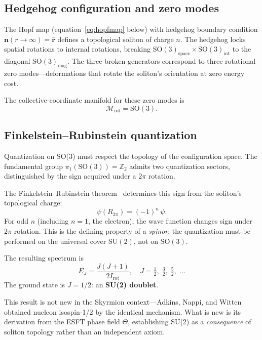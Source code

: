 \documentclass[a4paper,12pt]{article}
\begin{document}
\subsection{Hedgehog configuration and zero modes}

The Hopf map (equation~\eqref{eq:hopfmap} below) with hedgehog boundary condition
$\mathbf{n}(r \to \infty) = \hat{\mathbf{r}}$ defines a topological
soliton of charge $n$. The hedgehog locks spatial rotations to
internal rotations, breaking
$\mathrm{SO}(3)_{\mathrm{space}} \times \mathrm{SO}(3)_{\mathrm{int}}$
to the diagonal $\mathrm{SO}(3)_{\mathrm{diag}}$. The three broken
generators correspond to three rotational zero modes---deformations
that rotate the soliton's orientation at zero energy cost.

The collective-coordinate manifold for these zero modes is
\begin{equation}
 \mathcal{M}_{\mathrm{rot}} = \mathrm{SO}(3).
\end{equation}

\subsection{Finkelstein--Rubinstein quantization}
\label{sec:FR}

Quantization on SO(3) must respect the topology of the configuration
space. The fundamental group $\pi_1(\mathrm{SO}(3)) = \mathbb{Z}_2$
admits two quantization sectors, distinguished by the sign acquired
under a $2\pi$ rotation.

The Finkelstein--Rubinstein theorem~\cite{FR1968} determines this
sign from the soliton's topological charge:
\begin{equation}
\label{eq:FR}
 \boxed{\psi(R_{2\pi}) = (-1)^n\,\psi.}
\end{equation}
For odd $n$ (including $n = 1$, the electron), the wave function
changes sign under $2\pi$ rotation. This is the defining property
of a \emph{spinor}: the quantization must be performed on the
universal cover $\mathrm{SU}(2)$, not on $\mathrm{SO}(3)$.

The resulting spectrum is
\begin{equation}
 E_J = \frac{J(J+1)}{2I_{\mathrm{rot}}}, \quad
 J = \tfrac{1}{2},\;\tfrac{3}{2},\;\tfrac{5}{2},\;\ldots
\end{equation}
The ground state is $J = 1/2$: an \textbf{SU(2) doublet}.

This result is not new in the Skyrmion context---Adkins, Nappi, and
Witten~\cite{ANW1983} obtained nucleon isospin-1/2 by the identical
mechanism. What is new is its derivation from the ESFT phase field
$\Theta$, establishing SU(2) as a \emph{consequence} of soliton
topology rather than an independent axiom.
\end{document}
